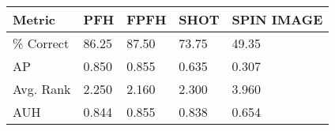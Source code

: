 \documentclass[10pt]{article}
\begin{document}
\begin{tabular}{ | l || l | l | l | l | }
\hline
Metric & PFH & FPFH & SHOT & SPIN IMAGE \\
\hline
 \% Correct & 86.25 & 87.50 & 73.75 & 49.35 \\
AP & 0.850 & 0.855 & 0.635 & 0.307 \\
Avg. Rank & 2.250 & 2.160 & 2.300 & 3.960 \\
AUH & 0.844 & 0.855 & 0.838 & 0.654 \\
\hline
\end{tabular}
\end{document}
